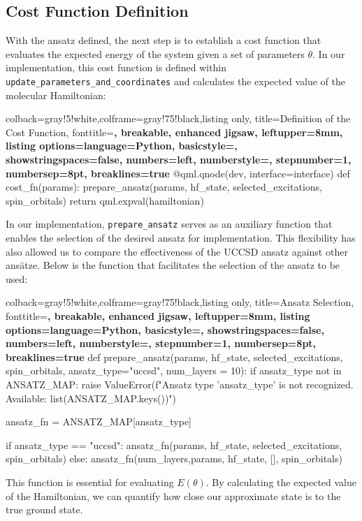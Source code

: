\subsection{Cost Function Definition}
With the ansatz defined, the next step is to establish a cost function that evaluates the expected energy of the system given a set of parameters \(\theta\). In our implementation, this cost function is defined within \texttt{update\_parameters\_and\_coordinates} and calculates the expected value of the molecular Hamiltonian:
  
  \begin{tcblisting}{colback=gray!5!white,colframe=gray!75!black,listing only,
    title=Definition of the Cost Function, fonttitle=\bfseries, breakable, enhanced jigsaw, leftupper=8mm,
    listing options={language=Python, basicstyle=\ttfamily\small,
    showstringspaces=false, numbers=left, numberstyle=\footnotesize, stepnumber=1, numbersep=8pt, breaklines=true}}
@qml.qnode(dev, interface=interface)
def cost_fn(params):
    prepare_ansatz(params, hf_state, selected_excitations, spin_orbitals)
    return qml.expval(hamiltonian)
  \end{tcblisting}
  
In our implementation, \texttt{prepare\_ansatz} serves as an auxiliary function that enables the selection of the desired ansatz for implementation. This flexibility has also allowed us to compare the effectiveness of the UCCSD ansatz against other ansätze. Below is the function that facilitates the selection of the ansatz to be used:

  
  \begin{tcblisting}{colback=gray!5!white,colframe=gray!75!black,listing only,
    title=Ansatz Selection, fonttitle=\bfseries, breakable, enhanced jigsaw, leftupper=8mm,
    listing options={language=Python, basicstyle=\ttfamily\small,
    showstringspaces=false, numbers=left, numberstyle=\footnotesize, stepnumber=1, numbersep=8pt, breaklines=true}}
def prepare_ansatz(params, hf_state, selected_excitations, spin_orbitals, ansatz_type="uccsd", num_layers = 10):
    if ansatz_type not in ANSATZ_MAP:
        raise ValueError(f"Ansatz type '{ansatz_type}' is not recognized. Available: {list(ANSATZ_MAP.keys())}")

    ansatz_fn = ANSATZ_MAP[ansatz_type]

    if ansatz_type == "uccsd":
        ansatz_fn(params, hf_state, selected_excitations, spin_orbitals)
    else:
        ansatz_fn(num_layers,params, hf_state, [], spin_orbitals)
    \end{tcblisting}
This function is essential for evaluating \(E(\theta)\). By calculating the expected value of the Hamiltonian, we can quantify how close our approximate state is to the true ground state.
